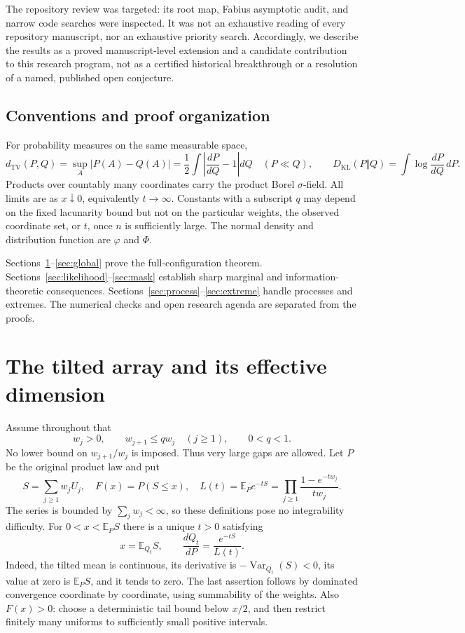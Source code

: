 \documentclass[11pt,letterpaper]{article}
\numberwithin{equation}{section}
\theoremstyle{definition}
\theoremstyle{remark}
\newcommand{\EE}{\mathbb E}
\newcommand{\TV}{d_{\mathrm{TV}}}
\newcommand{\KL}{D_{\mathrm{KL}}}
\newcommand{\Var}{\operatorname{Var}}
\begin{document}
The repository review was targeted: its root map, Fabius asymptotic audit,
and narrow code searches were inspected. It was not an exhaustive reading of
every repository manuscript, nor an exhaustive priority search. Accordingly,
we describe the results as a proved manuscript-level extension and a candidate
contribution to this research program, not as a certified historical
breakthrough or a resolution of a named, published open conjecture.

\subsection{Conventions and proof organization}

For probability measures on the same measurable space,
\[
 \TV(P,Q)=\sup_A|P(A)-Q(A)|
 =\frac12\int\left|\frac{dP}{dQ}-1\right|dQ
 \quad(P\ll Q),
 \qquad
 \KL(P\Vert Q)=\int\log\frac{dP}{dQ}\,dP.
\]
Products over countably many coordinates carry the product Borel
$\sigma$-field. All limits are as $x\downarrow0$, equivalently $t\to\infty$.
Constants with a subscript $q$ may depend on the fixed lacunarity bound but
not on the particular weights, the observed coordinate set, or $t$, once $n$
is sufficiently large. The normal density and distribution function are
$\varphi$ and $\Phi$.

Sections~\ref{sec:setup}--\ref{sec:global} prove the full-configuration theorem.
Sections~\ref{sec:likelihood}--\ref{sec:mask} establish sharp marginal and
information-theoretic consequences. Sections~\ref{sec:process}--\ref{sec:extreme}
handle processes and extremes. The numerical checks and open research agenda
are separated from the proofs.

\section{The tilted array and its effective dimension}
\label{sec:setup}

Assume throughout that
\begin{equation}
 w_j>0,\qquad w_{j+1}\le q w_j\quad(j\ge1),\qquad 0<q<1.
 \tag{L}\label{eq:lacunary}
\end{equation}
No lower bound on $w_{j+1}/w_j$ is imposed. Thus very large gaps are allowed.
Let $P$ be the original product law and put
\[
 S=\sum_{j\ge1}w_jU_j,\quad F(x)=P(S\le x),\quad
 L(t)=\EE_P e^{-tS}=
 \prod_{j\ge1}\frac{1-e^{-tw_j}}{tw_j}.
\]
The series is bounded by $\sum_jw_j<\infty$, so these definitions pose no
integrability difficulty. For $0<x<\EE_PS$ there is a unique $t>0$ satisfying
\begin{equation}
 x=\EE_{Q_t}S,\qquad
 \frac{dQ_t}{dP}=\frac{e^{-tS}}{L(t)}.
 \label{eq:tilt}
\end{equation}
Indeed, the tilted mean is continuous, its derivative is
$-\Var_{Q_t}(S)<0$, its value at zero is $\EE_PS$, and it tends to zero.
The last assertion follows by dominated convergence coordinate by coordinate,
using summability of the weights. Also $F(x)>0$: choose a deterministic tail
bound below $x/2$, and then restrict finitely many uniforms to sufficiently
small positive intervals.
\end{document}
